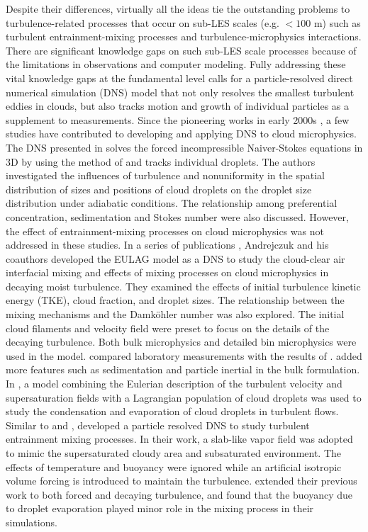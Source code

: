 \documentclass[draft,linenumbers]{agujournal}
\begin{document}
Despite their differences, virtually all the ideas tie the outstanding problems to turbulence-related processes that occur on sub-LES scales (e.g. $< 100$ m) such as turbulent entrainment-mixing processes and turbulence-microphysics interactions. There are significant knowledge gaps on such sub-LES scale processes because of the limitations in observations and computer modeling. Fully addressing these vital knowledge gaps at the fundamental level calls for a particle-resolved direct numerical simulation (DNS) model that not only resolves the smallest turbulent eddies in clouds, but also tracks motion and growth of individual particles as a supplement to measurements. Since the pioneering works in early 2000s \citep{Vaillancourt00, Vaillancourt02}, a few studies have contributed to developing and applying DNS to cloud microphysics. The DNS presented in \citet{Vaillancourt00, Vaillancourt02} solves the forced incompressible Naiver-Stokes equations in 3D by using the method of \citet{Sullivan1994} and tracks individual droplets. The authors investigated the influences of turbulence and nonuniformity in the spatial distribution of sizes and positions of cloud droplets on the droplet size distribution under adiabatic conditions. The relationship among preferential concentration, sedimentation and Stokes number were also discussed. However, the effect of entrainment-mixing processes on cloud microphysics was not addressed in these studies. In a series of publications \citep{And04, And06, And09}, Andrejczuk and his coauthors developed the EULAG model as a DNS to study the cloud-clear air interfacial mixing and effects of mixing processes on cloud microphysics in decaying moist turbulence. They examined the effects of initial turbulence kinetic energy (TKE), cloud fraction, and droplet sizes. The relationship between the mixing mechanisms and the Damk\"{o}hler number was also explored. The initial cloud filaments and velocity field were preset to focus on the details of the decaying turbulence. Both bulk microphysics and detailed bin microphysics were used in the model. \citet{Malinowski2008} compared laboratory measurements with the results of \citet{And04, And06}. \citet{LozarMellado2013} added more features such as sedimentation and particle inertial in the bulk formulation. In \citet{Lanotte2009, Celani05}, a model combining the Eulerian description of the turbulent velocity and supersaturation fields with a Lagrangian population of cloud droplets was used to study the condensation and evaporation of cloud droplets in turbulent flows. Similar to \citet{Vaillancourt02} and \citet{Lanotte2009}, \citet{Kumar11, Kumar12} developed a particle resolved DNS to study turbulent entrainment mixing processes. In their work, a slab-like vapor field was adopted to mimic the supersaturated cloudy area and subsaturated environment. The effects of temperature and buoyancy were ignored while an artificial isotropic volume forcing is introduced to maintain the turbulence. \citet{Kumar14} extended their previous work to both forced and decaying turbulence, and found that the buoyancy due to droplet evaporation played minor role in the mixing process in their simulations.
\end{document}
